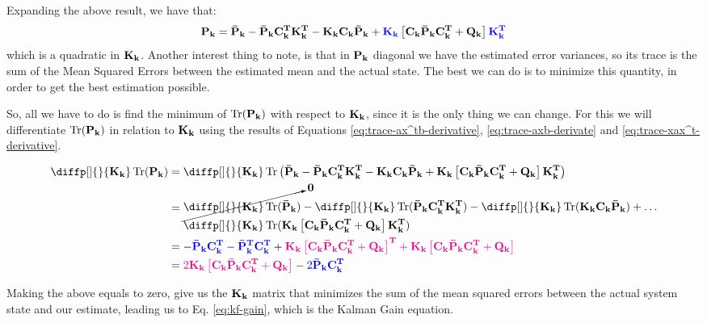 \documentclass[12pt]{article}
\begin{document}
Expanding the above result, we have that:
\begin{equation*}
    \boldsymbol{\mathbf{P_k}} = \boldsymbol{\mathbf{\bar{P}_k}} - \boldsymbol{\mathbf{\bar{P}_k}}\boldsymbol{\mathbf{C_k^T}}\boldsymbol{\mathbf{K_k^T}} - \boldsymbol{\mathbf{K_k C_k \bar{P}_k}} +  \color{blue}\boldsymbol{\mathbf{K_k}}\color{black}\left[\boldsymbol{\mathbf{C_k}}\boldsymbol{\mathbf{\bar{P}_k}}\boldsymbol{\mathbf{C_k^T}} + \boldsymbol{\mathbf{Q_k}}\right]\color{blue}\boldsymbol{\mathbf{K_k^T}}\color{black}
\end{equation*}
which is a quadratic in $\boldsymbol{\mathbf{K_k}}$. Another interest thing to note, is that in $\boldsymbol{\mathbf{P_k}}$ diagonal we have the estimated error variances, so its trace is the sum of the Mean Squared Errors between the estimated mean and the actual state. The best we can do is to minimize this quantity, in order to get the best estimation possible. 

So, all we have to do is find the minimum of $\operatorname{Tr}(\boldsymbol{\mathbf{P_k}})$ with respect to $\boldsymbol{\mathbf{K_k}}$, since it is the only thing we can change. For this we will differentiate $\operatorname{Tr}(\boldsymbol{\mathbf{P_k}})$ in relation to $\boldsymbol{\mathbf{K_k}}$ using the results of Equations \ref{eq:trace-ax^tb-derivative}, \ref{eq:trace-axb-derivate} and \ref{eq:trace-xax^t-derivative}.

\begin{equation}
   \begin{aligned}
       \diffp[]{}{\mat{K_k}}\Tr(\mat{P_k}) &= \diffp[]{}{\mat{K_k}} \Tr\parentheses{\mat{\bar{P}_k} - \mat{\bar{P}_k}\matT{C_k}\matT{K_k} - \mat{K_k C_k \bar{P}_k} +  \mat{K_k}\brac{\mat{C_k}\mat{\bar{P}_k}\matT{C_k} + \mat{Q_k}}\matT{K_k}}\\
       &= \begin{aligned}
       &\cancelto{\mat{0}}{\diffp[]{}{\mat{K_k}} \Tr(\mat{\bar{P}_k})} - \diffp[]{}{\mat{K_k}}\Tr(\mat{\bar{P}_k}\matT{C_k}\matT{K_k}) - \diffp[]{}{\mat{K_k}}\Tr(\mat{K_k C_k \bar{P}_k}) + \dots\\ &\diffp[]{}{\mat{K_k}}\Tr(\mat{K_k}\brac{\mat{C_k}\mat{\bar{P}_k}\matT{C_k} + \mat{Q_k}}\matT{K_k})
       \end{aligned}\\
       &= -\blue{\mat{\bar{P}_k}\matT{C_k} - \matT{\bar{P}_k}\matT{C_k}} + \magenta{\mat{K_k}\brac{\mat{C_k}\mat{\bar{P}_k}\matT{C_k} + \mat{Q_k}}^\mathbf{T} + \mat{K_k}\brac{\mat{C_k}\mat{\bar{P}_k}\matT{C_k} + \mat{Q_k}}}\\
       &= \magenta{2 \mat{K_k}\brac{\mat{C_k}\mat{\bar{P}_k}\matT{C_k} + \mat{Q_k}}} - \blue{2 \mat{\bar{P}_k}\matT{C_k}}
   \end{aligned} 
   \label{eq:kf-gain-calc}
\end{equation}

Making the above equals to zero, give us the $\boldsymbol{\mathbf{K_k}}$ matrix that minimizes the sum of the mean squared errors between the actual system state and our estimate, leading us to Eq. \ref{eq:kf-gain}, which is the Kalman Gain equation.
\end{document}
